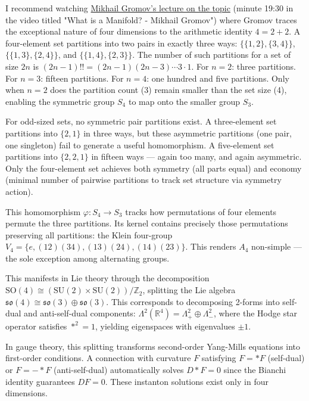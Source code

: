 I recommend watching \href{http://youtu.be/u5DLpAqX4YA&t=1170s}{Mikhail Gromov's lecture on the topic} (minute 19:30 in the video titled "What is a Manifold? - Mikhail Gromov") where Gromov traces the exceptional nature of four dimensions to the arithmetic identity $4 = 2 + 2$. A four-element set partitions into two pairs in exactly three ways: $\{\{1,2\}, \{3,4\}\}$, $\{\{1,3\}, \{2,4\}\}$, and $\{\{1,4\}, \{2,3\}\}$. The number of such partitions for a set of size $2n$ is $(2n-1)!! = (2n-1)(2n-3)\cdots 3 \cdot 1$. For $n=2$: three partitions. For $n=3$: fifteen partitions. For $n=4$: one hundred and five partitions. Only when $n=2$ does the partition count (3) remain smaller than the set size (4), enabling the symmetric group $S_4$ to map onto the smaller group $S_3$.

For odd-sized sets, no symmetric pair partitions exist. A three-element set partitions into $\{2,1\}$ in three ways, but these asymmetric partitions (one pair, one singleton) fail to generate a useful homomorphism. A five-element set partitions into $\{2,2,1\}$ in fifteen ways — again too many, and again asymmetric. Only the four-element set achieves both symmetry (all parts equal) and economy (minimal number of pairwise partitions to track set structure via symmetry action).

This homomorphism $\varphi: S_4 \to S_3$ tracks how permutations of four elements permute the three partitions. Its kernel contains precisely those permutations preserving all partitions: the Klein four-group $V_4 = \{e, (12)(34), (13)(24), (14)(23)\}$. This renders $A_4$ non-simple — the sole exception among alternating groups.

This manifests in Lie theory through the decomposition $\mathrm{SO}(4) \cong (\mathrm{SU}(2) \times \mathrm{SU}(2))/\mathbb{Z}_2$, splitting the Lie algebra $\mathfrak{so}(4) \cong \mathfrak{so}(3) \oplus \mathfrak{so}(3)$. This corresponds to decomposing 2-forms into self-dual and anti-self-dual components: $\Lambda^2(\mathbb{R}^4) = \Lambda^2_+ \oplus\Lambda^2_-$, where the Hodge star operator satisfies $*^2 = 1$, yielding eigenspaces with eigenvalues $\pm 1$.

In gauge theory, this splitting transforms second-order Yang-Mills equations into first-order conditions. A connection with curvature $F$ satisfying $F = *F$ (self-dual) or $F = -*F$ (anti-self-dual) automatically solves $D*F = 0$ since the Bianchi identity guarantees $DF = 0$. These instanton solutions exist only in four dimensions.

